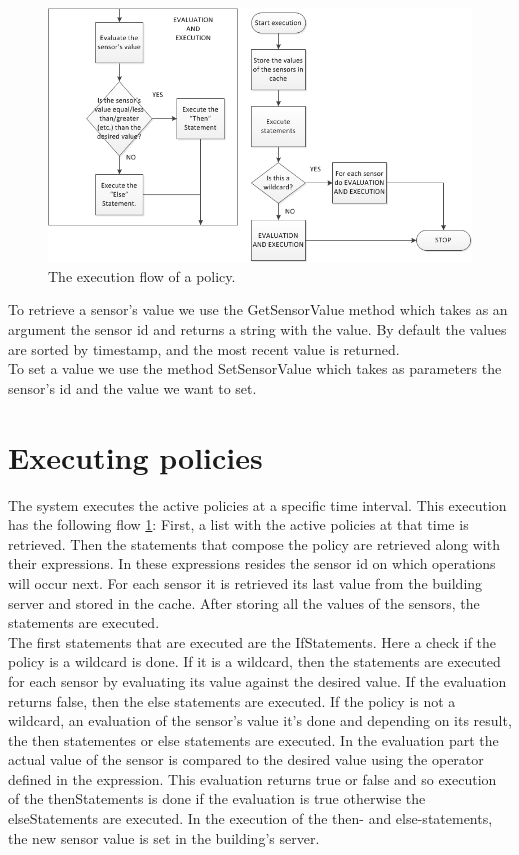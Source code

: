 \begin{figure}
	\centering
    \includegraphics[scale=0.65]{images/policy_execution_flow.png} 
	\caption{The execution flow of a policy.}
	\label{fig:policy_execution_workflow}
\end{figure}

To retrieve a sensor's value we use the GetSensorValue method which takes as an argument the sensor id and returns a string with the value. By default the values are sorted by timestamp, and the most recent value is returned.
\\ To set a value we use the method SetSensorValue which takes as parameters the sensor's id and the value we want to set. 
\section{Executing policies} 
The system executes the active policies at a specific time interval. This execution has the following flow \ref{fig:policy_execution_workflow}:
First, a list with the active policies at that time is retrieved. Then the statements that compose the policy are retrieved along with their expressions. In these expressions resides the sensor id on which operations will occur next. For each sensor it is retrieved its last value from the building server and stored in the cache. After storing all the values of the sensors, the statements are executed. 
\\The first statements that are executed are the IfStatements. Here a check if the policy is a wildcard is done.  If it is a wildcard, then the statements are executed for each sensor by evaluating its value against the desired value. If the evaluation returns false, then the else statements are executed. If the policy is not a wildcard, an evaluation of the sensor's value it's done and depending on its result, the then statementes or else statements are executed. 
In the evaluation part the actual value of the sensor is compared to the desired value using the operator defined in the expression. This evaluation returns true or false and so execution of the thenStatements is done if the evaluation is true otherwise the elseStatements are executed.
In the execution of the then- and else-statements, the new sensor value is set in the building's server. 
